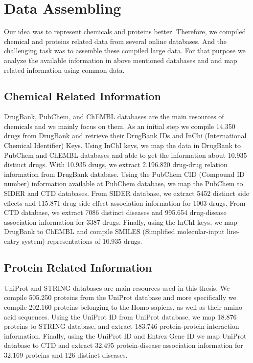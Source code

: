 \section{Data Assembling}

Our idea was to represent chemicals and proteins better. Therefore, we compiled chemical and proteins related data from several online databases. And the challenging task was to assemble these compiled large data. For that purpose we analyze the available information in above mentioned databases and and map related information using common data. 

\subsection{Chemical Related Information}
DrugBank, PubChem, and ChEMBL databases are the main resources of chemicals and we mainly focus on them. As an initial step we compile 14.350 drugs from DrugBank and retrieve their DrugBank IDs and InChi (International Chemical Identifier) Keys. Using InChI keys, we map the data in DrugBank to PubChem and ChEMBL databases and able to get the information about 10.935 distinct drugs. With 10.935 drugs, we extract 2.196.820 drug-drug relation information from DrugBank database. Using the PubChem CID (Compound ID number) information available at PubChem database, we map the PubChem to SIDER and CTD databases. From SIDER database, we extract 5452 distinct side effects and 115.871 drug-side effect association information for 1003 drugs. From CTD database, we extract 7086 distinct diseases and 995.654 drug-disease association information for 3387 drugs. Finally, using the InChI keys, we map DrugBank to ChEMBL and compile SMILES (Simplified molecular-input line-entry system) representations of 10.935 drugs. 

\subsection{Protein Related Information}
UniProt and STRING databases are main resources used in this thesis. We compile 505.250 proteins from the UniProt database and more specifically we compile 202.160 proteins belonging to the Homo sapiens, as well as their amino acid sequences. Using the UniProt ID from UniProt database, we map 18.876 proteins to STRING database, and extract 183.746 protein-protein interaction information. Finally, using the UniProt ID and Entrez Gene ID we map UniProt database to CTD and extract 32.495 protein-disease association information for 32.169 proteins and 126 distinct diseases.